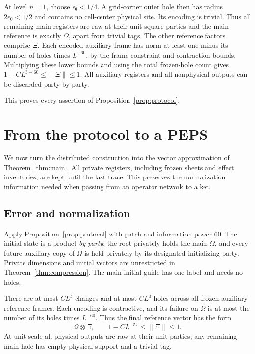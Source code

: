 \documentclass[11pt]{article}
\numberwithin{equation}{section}
\theoremstyle{definition}
\theoremstyle{remark}
\begin{document}
At level $n=1$, choose $\epsilon_0<1/4$.  A grid-corner outer hole
then has radius $2\epsilon_0<1/2$ and contains no cell-center physical
site.  Its encoding is trivial.  Thus all remaining main registers
are raw at their unit-square parties and the main reference is
exactly $\Omega$, apart from trivial tags.  The other reference
factors comprise $\Xi$.  Each encoded auxiliary frame has norm at
least one minus its number of holes times $L^{-60}$, by the frame
constraint and contraction bounds.  Multiplying these lower bounds
and using the total frozen-hole count gives
$1-C L^{3-60}\le\lVert \Xi\rVert\le1$.  All auxiliary registers and all
nonphysical outputs can be discarded party by party.

This proves every assertion of Proposition~\ref{prop:protocol}.

\section{From the protocol to a PEPS}\label{sec:assembly}

We now turn the distributed construction into the vector approximation of
Theorem~\ref{thm:main}. All private registers, including frozen sheets and
effect inventories, are kept until the last trace. This preserves the
normalization information needed when passing from an operator network
to a ket.

\subsection{Error and normalization}

Apply Proposition~\ref{prop:protocol} with patch and information power $60$.
The initial state is a product \emph{by party}: the root privately holds
the main $\Omega$, and every future auxiliary copy of $\Omega$ is held
privately by its designated initializing party. Private dimensions and
initial vectors are unrestricted in Theorem~\ref{thm:compression}.
The main initial guide has one label and needs no holes.

There are at most $CL^3$ changes and at most $CL^3$ holes across all frozen
auxiliary reference frames. Each encoding is contractive, and its failure
on $\Omega$ is at most the number of its holes times $L^{-60}$. Thus the
final reference vector has the form
\begin{equation}\label{eq:reference-junk}
 \Omega\otimes\Xi,
 \qquad 1-CL^{-57}\le\lVert \Xi\rVert\le1.
\end{equation}
At unit scale all physical outputs are raw at their unit parties; any
remaining main hole has empty physical support and a trivial tag.
\end{document}
